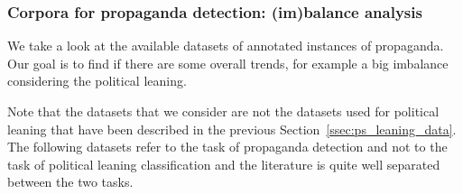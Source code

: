 









\subsubsection{\statusgreen Corpora for propaganda detection: (im)balance analysis}
\label{ssec:ps_prop_leaning_imbalanced_datasets}

We take a look at the available datasets of annotated instances of propaganda.
Our goal is to find if there are some overall trends, for example a big imbalance considering the political leaning.

Note that the datasets that we consider are not the datasets used for political leaning that have been described in the previous Section~\ref{ssec:ps_leaning_data}. The following datasets refer to the task of propaganda detection and not to the task of political leaning classification and the literature is quite well separated between the two tasks.

